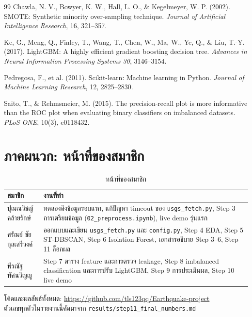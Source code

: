 \documentclass[11pt,a4paper]{article}
\newcommand{\code}[1]{\texttt{#1}}
\begin{document}
\begin{thebibliography}{99}
 Chawla, N. V., Bowyer, K. W., Hall, L. O., \& Kegelmeyer, W. P. (2002). SMOTE: Synthetic minority over-sampling technique. \textit{Journal of Artificial Intelligence Research}, 16, 321--357.

 Ke, G., Meng, Q., Finley, T., Wang, T., Chen, W., Ma, W., Ye, Q., \& Liu, T.-Y. (2017). LightGBM: A highly efficient gradient boosting decision tree. \textit{Advances in Neural Information Processing Systems 30}, 3146--3154.

 Pedregosa, F., et al. (2011). Scikit-learn: Machine learning in Python. \textit{Journal of Machine Learning Research}, 12, 2825--2830.

 Saito, T., \& Rehmsmeier, M. (2015). The precision-recall plot is more informative than the ROC plot when evaluating binary classifiers on imbalanced datasets. \textit{PLoS ONE}, 10(3), e0118432.
\end{thebibliography}

\appendix
\section{ภาคผนวก: หน้าที่ของสมาชิก}

\begin{table}[H]
\centering\small
\begin{tabularx}{\textwidth}{@{}lX@{}}
\toprule
สมาชิก & งานที่ทำ \\
\midrule\relax
ปุณณวิชญ์ คล้ายรักษ์ & ทดลองดึงข้อมูลรอบแรก, แก้ปัญหา timeout ของ \code{usgs\_fetch.py}, Step 3 การเตรียมข้อมูล (\code{02\_preprocess.ipynb}), live demo รุ่นแรก \\\relax
ศรัณย์ ชัยกุลเสรีวงค์ & ออกแบบและเขียน \code{usgs\_fetch.py} และ \code{config.py}, Step 4 EDA, Step 5 ST-DBSCAN, Step 6 Isolation Forest, เอกสารอธิบาย Step 3--6, Step 11 ล็อกผล \\
พีรณัฐ ทัศนวิญญู & Step 7 ตาราง feature และการตรวจ leakage, Step 8 imbalanced classification และการปรับ LightGBM, Step 9 การประเมินผล, Step 10 live demo \\
\bottomrule
\end{tabularx}
\caption{หน้าที่ของสมาชิก}
\end{table}

\noindent โค้ดและผลลัพธ์ทั้งหมด: \url{https://github.com/tls123qq/Earthquake-project}
\\ ตัวเลขทุกตัวในรายงานนี้คัดมาจาก \code{results/step11\_final\_numbers.md}
\end{document}
